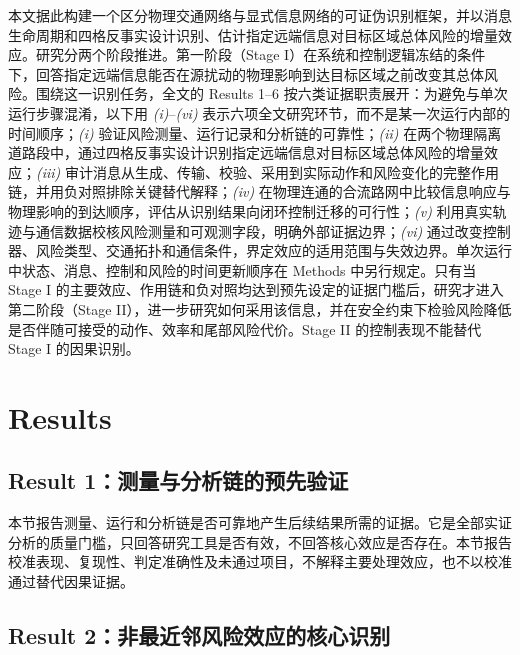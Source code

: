 \documentclass[10pt,a4paper,twocolumn]{article}
\newcommand{\revYellow}[1]{#1}
\newcommand{\revRed}[1]{#1}
\begin{document}
\revYellow{本文据此构建一个区分物理交通网络与显式信息网络的可证伪识别框架，并以消息生命周期和四格反事实设计识别、估计指定远端信息对目标区域总体风险的增量效应。研究分两个阶段推进。第一阶段（Stage I）在系统和控制逻辑冻结的条件下，回答指定远端信息能否在源扰动的物理影响到达目标区域之前改变其总体风险。围绕这一识别任务，全文的 Results 1--6 按六类证据职责展开：为避免与单次运行步骤混淆，以下用 \textit{(i)}--\textit{(vi)} 表示六项全文研究环节，而不是某一次运行内部的时间顺序；\textit{(i)} 验证风险测量、运行记录和分析链的可靠性；\textit{(ii)} 在两个物理隔离道路段中，通过四格反事实设计识别指定远端信息对目标区域总体风险的增量效应；\textit{(iii)} 审计消息从生成、传输、校验、采用到实际动作和风险变化的完整作用链，并用负对照排除关键替代解释；\textit{(iv)} 在物理连通的合流路网中比较信息响应与物理影响的到达顺序，评估从识别结果向闭环控制迁移的可行性；\textit{(v)} 利用真实轨迹与通信数据校核风险测量和可观测字段，明确外部证据边界；\textit{(vi)} 通过改变控制器、风险类型、交通拓扑和通信条件，界定效应的适用范围与失效边界。单次运行中状态、消息、控制和风险的时间更新顺序在 Methods 中另行规定。只有当 Stage I 的主要效应、作用链和负对照均达到预先设定的证据门槛后，研究才进入第二阶段（Stage II），进一步研究如何采用该信息，并在安全约束下检验风险降低是否伴随可接受的动作、效率和尾部风险代价。Stage II 的控制表现不能替代 Stage I 的因果识别。}


\section*{Results}

\subsection*{Result 1：测量与分析链的预先验证}

\revRed{本节报告测量、运行和分析链是否可靠地产生后续结果所需的证据。它是全部实证分析的质量门槛，只回答研究工具是否有效，不回答核心效应是否存在。本节报告校准表现、复现性、判定准确性及未通过项目，不解释主要处理效应，也不以校准通过替代因果证据。}

\subsection*{Result 2：非最近邻风险效应的核心识别}
\end{document}
